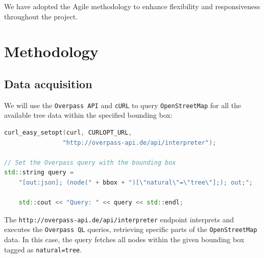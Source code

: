 \documentclass[12pt]{article}
\begin{document}

We have adopted the Agile methodology to enhance flexibility and responsiveness
throughout the project.

\newpage

\section{Methodology}

\subsection{Data acquisition}

We will use the \texttt{Overpass API} and \texttt{cURL} to query
\texttt{OpenStreetMap} for all the available tree data within the specified
bounding box:

\begin{lstlisting}[language=C++]
curl_easy_setopt(curl, CURLOPT_URL,
                "http://overpass-api.de/api/interpreter");

// Set the Overpass query with the bounding box
std::string query =
    "[out:json]; (node(" + bbox + ")[\"natural\"=\"tree\"];); out;";

    std::cout << "Query: " << query << std::endl;
\end{lstlisting}

The \texttt{http://overpass-api.de/api/interpreter} endpoint interprets and
executes the \texttt{Overpass QL}\cite{overpass-ql} queries, retrieving
specific parts of the \texttt{OpenStreetMap} data. In this case, the query
fetches all nodes within the given bounding box tagged as \texttt{natural=tree}.
\end{document}
